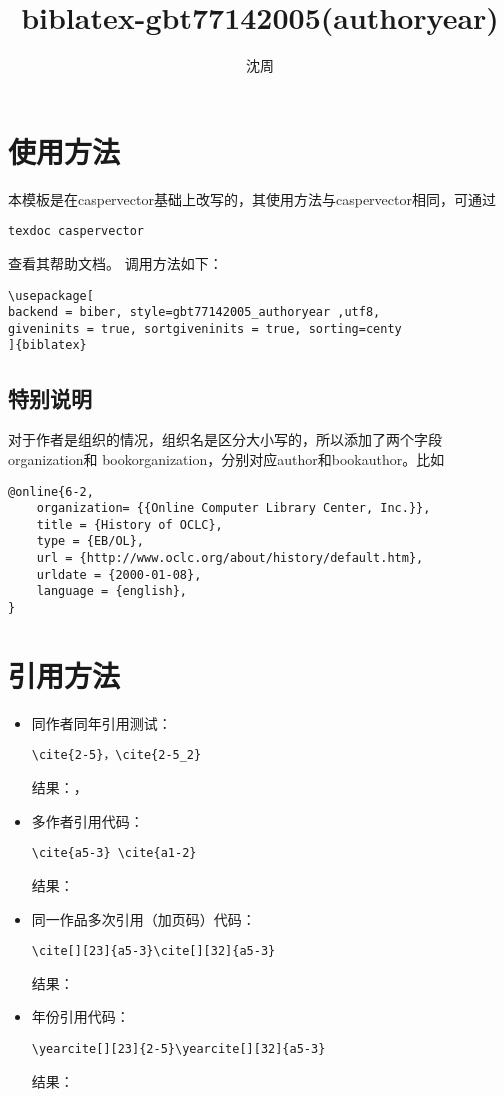 \documentclass{ctexart}
\title{biblatex-gbt77142005(authoryear)}
\author{沈周}
\begin{document}
\maketitle
\section{使用方法}
本模板是在caspervector基础上改写的，其使用方法与caspervector相同，可通过
\begin{verbatim}
texdoc caspervector
\end{verbatim}
查看其帮助文档。
调用方法如下：
\begin{verbatim}
\usepackage[
backend = biber, style=gbt77142005_authoryear ,utf8,
giveninits = true, sortgiveninits = true, sorting=centy
]{biblatex}
\end{verbatim}
\subsection{特别说明}
对于作者是组织的情况，组织名是区分大小写的，所以添加了两个字段organization和
bookorganization，分别对应author和bookauthor。比如
\begin{verbatim}
@online{6-2,
    organization= {{Online Computer Library Center, Inc.}},
    title = {History of OCLC},
    type = {EB/OL},
    url = {http://www.oclc.org/about/history/default.htm},
    urldate = {2000-01-08},
    language = {english},
}
\end{verbatim}
\section{引用方法}
\begin{itemize}
    \item 同作者同年引用测试：
        \begin{verbatim}
\cite{2-5}，\cite{2-5_2}
        \end{verbatim}
        结果：\cite{2-5}，\cite{2-5_2}
    \item 多作者引用代码：
        \begin{verbatim}
\cite{a5-3} \cite{a1-2}
        \end{verbatim}
        结果：\cite{a5-3} \cite{a1-2}
    \item 同一作品多次引用（加页码）代码：
        \begin{verbatim}
\cite[][23]{a5-3}\cite[][32]{a5-3}
        \end{verbatim}
        结果：\cite[][23]{a5-3}\cite[][32]{a5-3}
    \item 年份引用代码：
        \begin{verbatim}
\yearcite[][23]{2-5}\yearcite[][32]{a5-3}
        \end{verbatim}
        结果：
\end{itemize}
\nocite{*}
\printbibliography[title={参考文献},heading=bibintoc]
\end{document}

